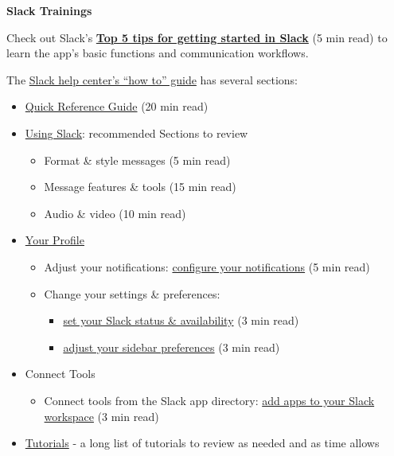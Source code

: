 \documentclass[
]{book}
\providecommand{\tightlist}{%
  \setlength{\itemsep}{0pt}\setlength{\parskip}{0pt}}
\begin{document}
\textbf{Slack Trainings}

Check out Slack's \href{https://slack.com/intl/en-in/resources/using-slack/top-5-tips-for-getting-started-in-slack}{\textbf{Top 5 tips for getting started in Slack}} (5 min read) to learn the app's basic functions and communication workflows.

The \href{https://slack.com/help/articles/360059928654-How-to-use-Slack--your-quick-start-guide}{Slack help center's ``how to'' guide} has several sections:

\begin{itemize}
\tightlist
\item
  \href{https://slack.com/help/articles/360059928654-How-to-use-Slack--your-quick-start-guide\#sidebar}{Quick Reference Guide} (20 min read)
\item
  \href{https://slack.com/help/categories/200111606}{Using Slack}: recommended Sections to review

  \begin{itemize}
  \tightlist
  \item
    Format \& style messages (5 min read)
  \item
    Message features \& tools (15 min read)
  \item
    Audio \& video (10 min read)
  \end{itemize}
\item
  \href{https://slack.com/help/categories/360000047906}{Your Profile}

  \begin{itemize}
  \tightlist
  \item
    Adjust your notifications: \href{https://slack.com/help/articles/201355156-Configure-your-Slack-notifications}{configure your notifications} (5 min read)
  \item
    Change your settings \& preferences:

    \begin{itemize}
    \tightlist
    \item
      \href{https://slack.com/help/articles/201864558-Set-your-Slack-status-and-availability}{set your Slack status \& availability} (3 min read)
    \item
      \href{https://slack.com/help/articles/212596808-Adjust-your-sidebar-preferences}{adjust your sidebar preferences} (3 min read)
    \end{itemize}
  \end{itemize}
\item
  Connect Tools

  \begin{itemize}
  \tightlist
  \item
    Connect tools from the Slack app directory: \href{https://slack.com/help/articles/202035138-Add-apps-to-your-Slack-workspace}{add apps to your Slack workspace} (3 min read)
  \end{itemize}
\item
  \href{https://slack.com/help/categories/360000049063}{Tutorials} - a long list of tutorials to review as needed and as time allows
\end{itemize}
\end{document}
